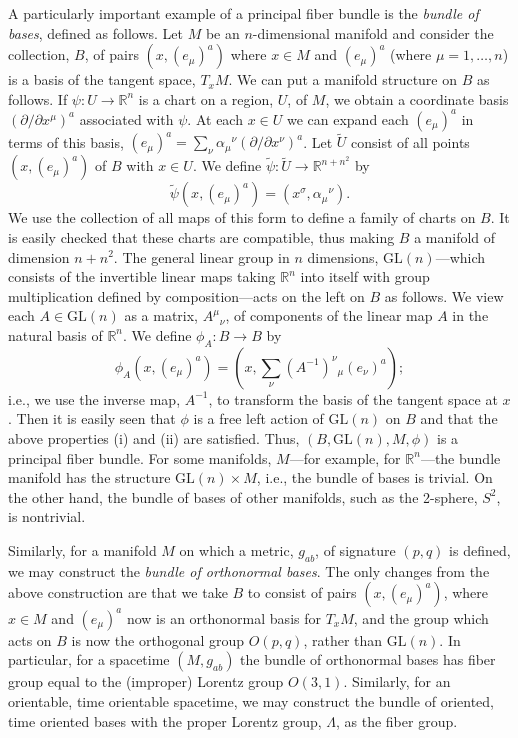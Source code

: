 A particularly important example of a principal fiber bundle is the \emph{bundle of
bases}, defined as follows. Let \(M\) be an \(n\)-dimensional manifold and consider
the collection, \(B\), of pairs \((x,(e_\mu)^a)\) where \(x\in M\) and
\((e_\mu)^a\) (where \(\mu=1,\ldots,n\)) is a basis of the tangent space,
\(T_xM\). We can put a manifold structure on \(B\) as follows. If
\(\psi:U\longrightarrow\mathbb R^n\) is a chart on a region, \(U\), of \(M\), we
obtain a coordinate basis \((\partial/\partial x^\mu)^a\) associated with \(\psi\).
At each \(x\in U\) we can expand each \((e_\mu)^a\) in terms of this basis,
\((e_\mu)^a=\sum_\nu\alpha_\mu{}^\nu(\partial/\partial x^\nu)^a\). Let
\(\widetilde U\) consist of all points \((x,(e_\mu)^a)\) of \(B\) with \(x\in U\).
We define \(\widetilde\psi:\widetilde U\longrightarrow\mathbb R^{n+n^2}\) by
\begin{equation}
  \widetilde\psi(x,(e_\mu)^a)=(x^\sigma,\alpha_\mu{}^\nu).
  \tag{13.2.2}\label{eq:13.2.2}
\end{equation}
We use the collection of all maps of this form to define a family of charts on
\(B\). It is easily checked that these charts are compatible, thus making \(B\) a
manifold of dimension \(n+n^2\). The general linear group in \(n\) dimensions,
\(\mathrm{GL}(n)\)---which consists of the invertible linear maps taking
\(\mathbb R^n\) into itself with group multiplication defined by
composition---acts on the left on \(B\) as follows. We view each
\(A\in\mathrm{GL}(n)\) as a matrix, \(A^\mu{}_\nu\), of components of the linear map
\(A\) in the natural basis of \(\mathbb R^n\). We define
\(\phi_A:B\longrightarrow B\) by
\begin{equation}
  \phi_A(x,(e_\mu)^a)
  =\left(x,\sum_\nu(A^{-1})^\nu{}_\mu(e_\nu)^a\right);
  \tag{13.2.3}\label{eq:13.2.3}
\end{equation}
i.e., we use the inverse map, \(A^{-1}\), to transform the basis of the tangent
space at \(x\). Then it is easily seen that \(\phi\) is a free left action of
\(\mathrm{GL}(n)\) on \(B\) and that the above properties (i) and (ii) are
satisfied. Thus, \((B,\mathrm{GL}(n),M,\phi)\) is a principal fiber bundle. For
some manifolds, \(M\)---for example, for \(\mathbb R^n\)---the bundle manifold has
the structure \(\mathrm{GL}(n)\times M\), i.e., the bundle of bases is trivial. On
the other hand, the bundle of bases of other manifolds, such as the 2-sphere,
\(S^2\), is nontrivial.

Similarly, for a manifold \(M\) on which a metric, \(g_{ab}\), of signature
\((p,q)\) is defined, we may construct the \emph{bundle of orthonormal bases}. The
only changes from the above construction are that we take \(B\) to consist of pairs
\((x,(e_\mu)^a)\), where \(x\in M\) and \((e_\mu)^a\) now is an orthonormal basis for
\(T_xM\), and the group which acts on \(B\) is now the orthogonal group \(O(p,q)\),
rather than \(\mathrm{GL}(n)\). In particular, for a spacetime \((M,g_{ab})\) the
bundle of orthonormal bases has fiber group equal to the (improper) Lorentz group
\(O(3,1)\). Similarly, for an orientable, time orientable spacetime, we may
construct the bundle of oriented, time oriented bases with the proper Lorentz group,
\(\Lambda\), as the fiber group.

